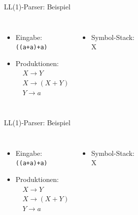 \documentclass[18pt]{beamer}
\begin{document}
\begin{frame}{LL(1)-Parser: Beispiel}
    \begin{columns}[c]
        \begin{itemize}
            \item Eingabe:\\
            \vspace{.1in}
            \texttt{((a+a)+a)}\\
            \vspace{.2in}
            \item Produktionen:\\
            \vspace{.1in}
                $\quad X \longrightarrow Y$\\
                $\quad X \longrightarrow (X+Y)$\\
                $\quad Y \longrightarrow \mathit{a}$\\
        \end{itemize}
        \begin{itemize}
            \item Symbol-Stack:\\
            \vspace{.1in}
            X
        \end{itemize}
    \end{columns}
\end{frame}

\begin{frame}{LL(1)-Parser: Beispiel}
    \begin{columns}[c]
        \begin{itemize}
            \item Eingabe:\\
            \vspace{.1in}
            \texttt{\alert{(}(a+a)+a)}\\
            \vspace{.2in}
            \item Produktionen:\\
            \vspace{.1in}
                $\quad X \longrightarrow Y$\\
                \alert{$\quad X \longrightarrow (X+Y)$}\\
                $\quad Y \longrightarrow \mathit{a}$\\
        \end{itemize}
        \begin{itemize}
            \item Symbol-Stack:\\
            \vspace{.1in}
            \alert{X}
        \end{itemize}
    \end{columns}
\end{frame}
\end{document}
